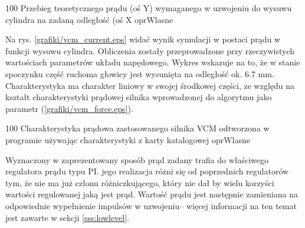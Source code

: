 	{100}
	{Przebieg teoretycznego prądu (oś Y) wymaganego w uzwojeniu do wysuwu cylindra na zadaną odległość (oś X}
	{oprWlasne}
	
Na rys. \ref{grafiki/vcm_current.eps} widać wynik symulacji w postaci prądu w funkcji wysuwu cylindra. Obliczenia zostały przeprowadzone przy rzeczywistych wartościach parametrów układu napędowego. Wykres wskazuje na to, że w stanie spoczynku część ruchoma głowicy jest wysunięta na odległość ok. 6.7 mm. Charakterystyka ma charakter liniowy w swojej środkowej części, ze względu na kształt charakterystyki prądowej silnika wprowadzonej do algorytmu jako parametr (\ref{grafiki/vcm_force.eps}).

	{100}
	{Charakterystyka prądowa zastosowanego silnika VCM odtworzona w programie używając charakterystyki z karty katalogowej}
	{oprWlasne}

Wyznaczony w zaprezentowany sposób prąd zadany trafia do właściwego regulatora prądu typu PI. jego realizacja różni się od poprzednich regulatorów tym, że nie ma już członu różniczkującego, który nie dał by wielu korzyści wartości regulowanej jaką jest prąd. Wartość prądu jest następnie zamieniana na odpowiednie wypełnienie impulsów w uzwojeniu-- więcej informacji na ten temat jest zawarte w sekcji \ref{sss:lowlevel}.



















\clearpage